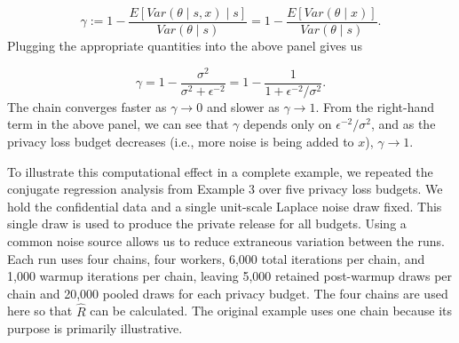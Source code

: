 \begin{equation*}
\gamma := 1 - \dfrac{E[Var(\theta \mid s, x) \mid s]}{Var(\theta \mid s)} = 1 - \dfrac{E[Var(\theta \mid x)]}{Var(\theta \mid s)}.
\end{equation*}
Plugging the appropriate quantities into the above panel gives us

\begin{equation*}
\gamma = 1 - \dfrac{\sigma^2}{\sigma^2 + \epsilon^{-2}} = 1 - \dfrac{1}{1 + \epsilon^{-2}/\sigma^2}.
\end{equation*}
The chain converges faster as \(\gamma \to 0\) and slower as \(\gamma \to 1\).
From the right-hand term in the above panel, we can see that \(\gamma\)
depends only on \(\epsilon^{-2}/\sigma^2\), and as the privacy loss budget decreases (i.e., more noise is being added to \(x\)),
\(\gamma \to 1\).

To illustrate this computational effect in a complete example, we repeated
the conjugate regression analysis from Example 3 over five privacy loss
budgets. We hold the confidential data and a single unit-scale
Laplace noise draw fixed. This single draw is used to produce the
private release for all budgets. Using a common noise source allows us to reduce
extraneous variation between the runs. Each run uses four chains, four
workers, 6,000 total iterations per chain, and 1,000 warmup iterations per
chain, leaving 5,000 retained post-warmup draws per chain and 20,000 pooled
draws for each privacy budget. The four
chains are used here so that \(\widehat{R}\) can be calculated. The original
example uses one chain because its purpose is primarily illustrative.

